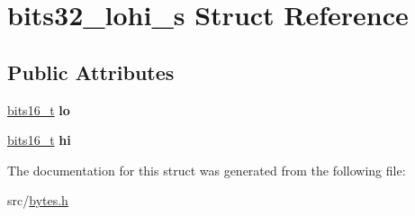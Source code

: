 \hypertarget{structbits32__lohi__s}{}\section{bits32\+\_\+lohi\+\_\+s Struct Reference}
\label{structbits32__lohi__s}
\subsection*{Public Attributes}
\begin{DoxyCompactItemize}
\item 
\hypertarget{structbits32__lohi__s_a2bb6689fada2f0b307c3598ae2240cda}{}\label{structbits32__lohi__s_a2bb6689fada2f0b307c3598ae2240cda} 
\hyperlink{unionbits16__s}{bits16\+\_\+t} {\bfseries lo}
\item 
\hypertarget{structbits32__lohi__s_a6c46dfbcf186ea55f520cd63aa043e32}{}\label{structbits32__lohi__s_a6c46dfbcf186ea55f520cd63aa043e32} 
\hyperlink{unionbits16__s}{bits16\+\_\+t} {\bfseries hi}
\end{DoxyCompactItemize}


The documentation for this struct was generated from the following file\+:\begin{DoxyCompactItemize}
\item 
src/\hyperlink{bytes_8h}{bytes.\+h}\end{DoxyCompactItemize}
